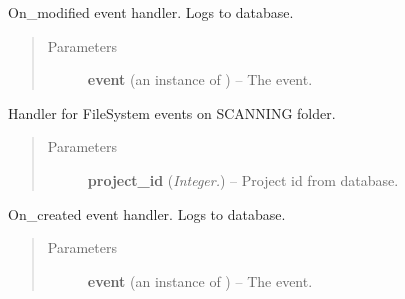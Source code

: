 \documentclass[letterpaper,10pt,english]{sphinxmanual}
\begin{document}
\begin{fulllineitems}

\begin{fulllineitems}
\label{controller:controller.PROJECT_FILE_EVENT_HANDLER.on_modified}
On\_modified event handler. Logs to database.
\begin{quote}\begin{description}
\item[{Parameters}] \leavevmode
\textbf{event} (an instance of ) -- The event.

\end{description}\end{quote}

\end{fulllineitems}


\end{fulllineitems}


\begin{fulllineitems}
\label{controller:controller.SCAN_HANDLER}
Handler for FileSystem events on SCANNING folder.
\begin{quote}\begin{description}
\item[{Parameters}] \leavevmode
\textbf{project\_id} (\emph{Integer.}) -- Project id from database.

\end{description}\end{quote}

\begin{fulllineitems}
\label{controller:controller.SCAN_HANDLER.on_created}
On\_created event handler. Logs to database.
\begin{quote}\begin{description}
\item[{Parameters}] \leavevmode
\textbf{event} (an instance of ) -- The event.

\end{description}\end{quote}

\end{fulllineitems}


\end{fulllineitems}
\end{document}
